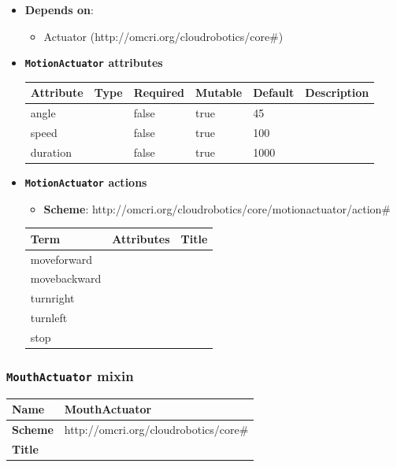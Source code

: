 \begin{itemize}
\item \textbf{Depends on}:
\begin{itemize}
	\item Actuator (http://omcri.org/cloudrobotics/core\#)
\end{itemize}
\end{itemize}

\begin{itemize}
\item \textbf{\texttt{MotionActuator} attributes}

\begin{tabularx}{\textwidth}{|l|l|p{1.4cm}|p{1.3cm}|l|X|}
  \hline
  \textbf{Attribute} & \textbf{Type} & \textbf{Required} & \textbf{Mutable} & \textbf{Default} & \textbf{Description} \\
  \hline  
  angle &  & false & true & 45 &  \\
  \hline
  speed &  & false & true & 100 &  \\
  \hline
  duration &  & false & true & 1000 &  \\
  \hline
\end{tabularx}
\end{itemize}

\begin{itemize}
\item \textbf{\texttt{MotionActuator} actions}

\begin{itemize}
	\item \textbf{Scheme}: http://omcri.org/cloudrobotics/core/motionactuator/action\#
\end{itemize}

\begin{center}
\begin{tabular}{|l|l|l|}
  \hline
  \textbf{Term}  & \textbf{Attributes} & \textbf{Title} \\
  \hline  
  moveforward & &  \\
  \hline
  movebackward & &  \\
  \hline
  turnright & &  \\
  \hline
  turnleft & &  \\
  \hline
  stop & &  \\
  \hline
\end{tabular}
\end{center}
\end{itemize}

 
\subsubsection{\texttt{MouthActuator} mixin}
\begin{center}
\begin{tabular}{|l|l|}
  \hline
  \textbf{Name} & MouthActuator \\
  \hline  
  \textbf{Scheme} & http://omcri.org/cloudrobotics/core\# \\
  \hline
  \textbf{Title} &  \\
  \hline
\end{tabular}
\end{center}

